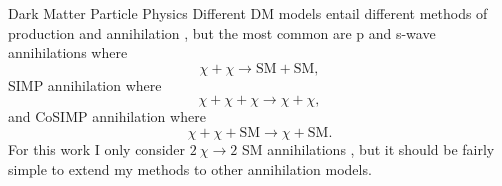 \documentclass[a4paper,11pt]{article}
\begin{document}
\begin{section}{Dark Matter Particle Physics}
    Different DM models entail different methods of production and annihilation \cite{Ilie:2020popiii}, but the most common are p and s-wave annihilations where
    \begin{equation}
        \chi + \chi \to \text{SM} + \text{SM},
    \end{equation}
    SIMP annihilation \cite{Hochberg:2014} where
    \begin{equation}
        \chi + \chi  + \chi \to \chi + \chi ,
    \end{equation}
    and CoSIMP annihilation \cite{Smirnov:2020} where
    \begin{equation}
        \chi + \chi + \text{SM} \to \chi + \text{SM}.
    \end{equation}
    For this work I only consider $2 ~\chi \to 2$ SM annihilations , but it should be fairly simple to extend my methods to other annihilation models. 
\end{section}
\end{document}
